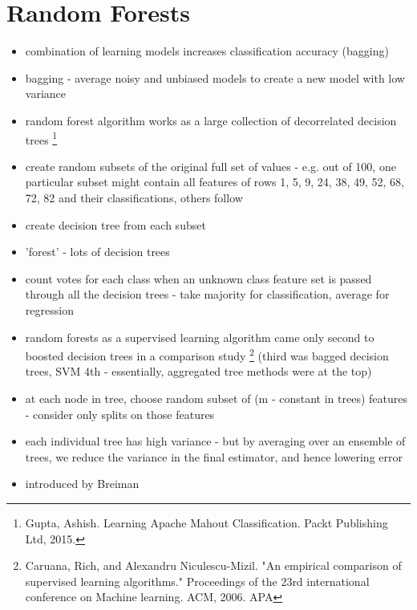 \documentclass[12pt]{article}
\begin{document}
\section{Random Forests}
\begin{itemize}
    \item combination of learning models increases classification accuracy (bagging)
    \item bagging - average noisy and unbiased models to create a new model with low variance
    \item random forest algorithm works as a large collection of decorrelated decision trees \footnote{Gupta, Ashish. Learning Apache Mahout Classification. Packt Publishing Ltd, 2015.}
    \item create random subsets of the original full set of values - e.g. out of 100, one particular subset might contain all features of rows 1, 5, 9, 24, 38, 49, 52, 68, 72, 82 and their classifications, others follow
    \item create decision tree from each subset
    \item 'forest' - lots of decision trees
    \item count votes for each class when an unknown class feature set is passed through all the decision trees - take majority for classification, average for regression
    \item random forests as a supervised learning algorithm came only second to boosted decision trees in a comparison study \footnote{Caruana, Rich, and Alexandru Niculescu-Mizil. "An empirical comparison of supervised learning algorithms." Proceedings of the 23rd international conference on Machine learning. ACM, 2006. APA } (third was bagged decision trees, SVM 4th - essentially, aggregated tree methods were at the top)
    \item at each node in tree, choose random subset of (m - constant in trees) features - consider only splits on those features
    \item each individual tree has high variance - but by averaging over an ensemble of trees, we reduce the variance in the final estimator, and hence lowering error
    \item introduced by Breiman
\end{itemize}
\end{document}
